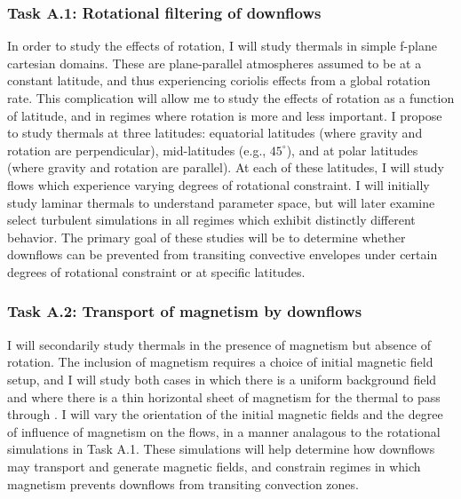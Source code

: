 \documentclass[aasms,12pt]{article}
\begin{document}
\subsubsection{Task A.1: Rotational filtering of downflows}
In order to study the effects of rotation, I will study thermals in simple f-plane cartesian domains.
These are plane-parallel atmospheres assumed to be at a constant latitude, and thus experiencing coriolis effects from a global rotation rate.
This complication will allow me to study the effects of rotation as a function of latitude, and in regimes where rotation is more and less important.
I propose to study thermals at three latitudes: equatorial latitudes (where gravity and rotation are perpendicular), mid-latitudes (e.g., $45^\circ$), and at polar latitudes (where gravity and rotation are parallel).
At each of these latitudes, I will study flows which experience varying degrees of rotational constraint.
I will initially study laminar thermals to understand parameter space, but will later examine select turbulent simulations in all regimes which exhibit distinctly different behavior.
The primary goal of these studies will be to determine whether downflows can be prevented from transiting convective envelopes under certain degrees of rotational constraint or at specific latitudes.

\subsubsection{Task A.2: Transport of magnetism by downflows}
I will secondarily study thermals in the presence of magnetism but absence of rotation.
The inclusion of magnetism requires a choice of initial magnetic field setup, and I will study both cases in which there is a uniform background field and where there is a thin horizontal sheet of magnetism for the thermal to pass through \citep[as in][]{tobias&all1998}.
I will vary the orientation of the initial magnetic fields and the degree of influence of magnetism on the flows, in a manner analagous to the rotational simulations in Task A.1.
These simulations will help determine how downflows may transport and generate magnetic fields, and constrain regimes in which magnetism prevents downflows from transiting convection zones. 
\end{document}
